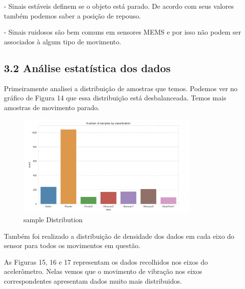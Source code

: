 - Sinais estáveis definem se o objeto está parado. De acordo com seus valores também podemos saber a posição de repouso.

- Sinais ruidosos são bem comuns em sensores MEMS e por isso não podem ser associados à algum tipo de movimento.




\subsection*{3.2 Análise estatística dos dados}

Primeiramente analisei a distribuição de amostras que temos.
Podemos ver no gráfico de Figura 14 que essa distribuição está desbalanceada.
Temos mais amostras de movimento parado.

\begin{figure}[H]
    \center
    \includegraphics[width=9cm]{images/sampleDistribution.png}
    \caption{ sample Distribution }
\end{figure}

Também foi realizado a distribuição de densidade dos dados em cada eixo do sensor 
para todos os movimentos em questão.

As Figuras 15, 16 e 17 representam os dados recolhidos nos eixos do acelerômetro.
Nelas vemos que o movimento de vibração nos eixos correspondentes apresentam dados muito mais distribuidos.


